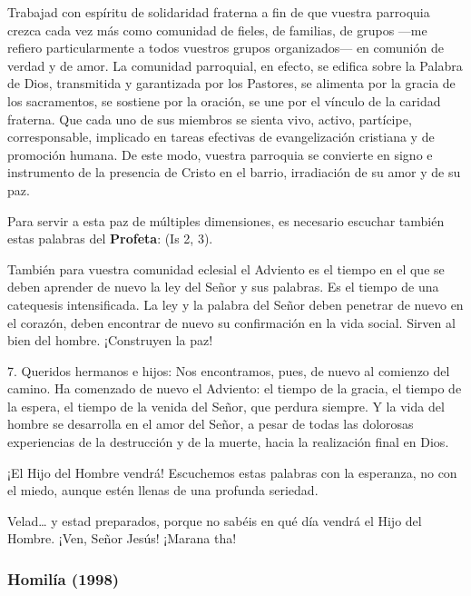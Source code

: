 Trabajad con espíritu de solidaridad fraterna a fin de que vuestra parroquia crezca cada vez más como comunidad de fieles, de familias, de grupos ---me refiero particularmente a todos vuestros grupos organizados--- en comunión de verdad y de amor. La comunidad parroquial, en efecto, se edifica sobre la Palabra de Dios, transmitida y garantizada por los Pastores, se alimenta por la gracia de los sacramentos, se sostiene por la oración, se une por el vínculo de la caridad fraterna. Que cada uno de sus miembros se sienta vivo, activo, partícipe, corresponsable, implicado en tareas efectivas de evangelización cristiana y de promoción humana. De este modo, vuestra parroquia se convierte en signo e instrumento de la presencia de Cristo en el barrio, irradiación de su amor y de su paz.

Para servir a esta paz de múltiples dimensiones, es necesario escuchar también estas palabras del \textbf{Profeta}:  (Is 2, 3).

También para vuestra comunidad eclesial el Adviento es el tiempo en el que se deben aprender de nuevo la ley del Señor y sus palabras. Es el tiempo de una catequesis intensificada. La ley y la palabra del Señor deben penetrar de nuevo en el corazón, deben encontrar de nuevo su confirmación en la vida social. Sirven al bien del hombre. ¡Construyen la paz!

7. Queridos hermanos e hijos: Nos encontramos, pues, de nuevo al comienzo del camino. Ha comenzado de nuevo el Adviento: el tiempo de la gracia, el tiempo de la espera, el tiempo de la venida del Señor, que perdura siempre. Y la vida del hombre se desarrolla en el amor del Señor, a pesar de todas las dolorosas experiencias de la destrucción y de la muerte, hacia la realización final en Dios.

¡El Hijo del Hombre vendrá! Escuchemos estas palabras con la esperanza, no con el miedo, aunque estén llenas de una profunda seriedad.

Velad\ldots{} y estad preparados, porque no sabéis en qué día vendrá el Hijo del Hombre. ¡Ven, Señor Jesús! ¡Marana tha!


\subsubsection{Homilía (1998)}


